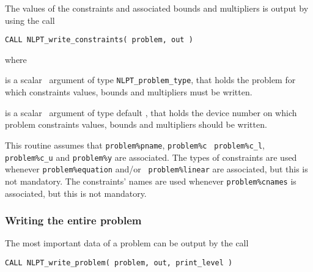 \documentclass{galahad}
\newcommand{\packagename}{NLPT}
\begin{document}
The values of the constraints and associated bounds and multipliers is output
by using the call
\vspace*{1mm}

\hspace{8mm}
{\tt CALL \packagename\_write\_constraints( problem, out )}

\noindent where
\begin{description}
 is a scalar \intentin\ argument of type {\tt NLPT\_problem\_type},
that holds the problem for which constraints values, bounds and multipliers
must be written.

 is a scalar \intentin\ argument of type default \integer, that
holds the device number on which problem constraints values, bounds and
multipliers should be written.
\end{description}

\noindent
This routine assumes that {\tt problem\%pname}, {\tt problem\%c} {\tt
problem\%c\_l}, {\tt problem\%c\_u} and {\tt problem\%y} are associated.  The
types of constraints are used whenever {\tt problem\%equation} and/or {\tt
problem\%linear} are associated, but this is not mandatory.  The constraints'
names are used whenever {\tt problem\%cnames} is associated, but this is not
mandatory.

\subsubsection{Writing the entire problem}
\label{w_prob}

The most important data of a problem can be output by the call
\vspace*{1mm}

\hspace{8mm}
{\tt CALL \packagename\_write\_problem( problem, out, print\_level )}
\end{document}
